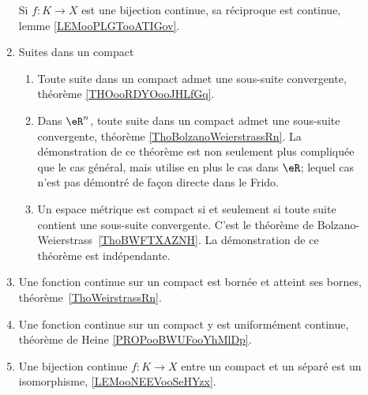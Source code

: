 \begin{description}
\begin{enumerate}
                    Si \( f\colon K\to X\) est une bijection continue, sa réciproque est continue, lemme \ref{LEMooPLGTooATIGov}.
		      \item
		            Suites dans un compact
		            \begin{enumerate}
			            \item
			                  Toute suite dans un compact admet une sous-suite convergente, théorème \ref{THOooRDYOooJHLfGq}.
			            \item
			                  Dans \( \eR^n\), toute suite dans un compact admet une sous-suite convergente, théorème \ref{ThoBolzanoWeierstrassRn}. La démonstration de ce théorème est non seulement plus compliquée que le cas général, mais utilise en plus le cas dans \( \eR\); lequel cas n'est pas démontré de façon directe dans le Frido.
			            \item
			                  Un espace métrique est compact si et seulement si toute suite contient une sous-suite convergente. C'est le théorème de Bolzano-Weierstrass~\ref{ThoBWFTXAZNH}. La démonstration de ce théorème est indépendante.
		            \end{enumerate}
		      \item
		            Une fonction continue sur un compact est bornée et atteint ses bornes, théorème~\ref{ThoWeirstrassRn}.
		      \item
		            Une fonction continue sur un compact y est uniformément continue, théorème de Heine \ref{PROPooBWUFooYhMlDp}.
                \item
                    Une bijection continue \( f\colon K\to X\) entre un compact et un séparé est un isomorphisme, \ref{LEMooNEEVooSeHYzx}.
	      \end{enumerate}


\end{description}
